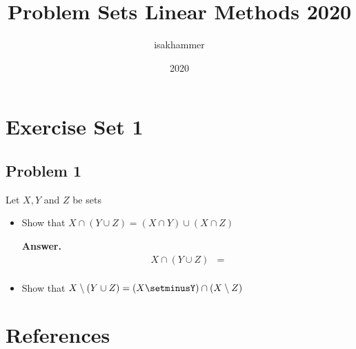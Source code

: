 \documentclass{article}
\title{Problem Sets Linear Methods 2020}
\author{isakhammer }
\date{2020}
\theoremstyle{remark}
\begin{document}
\maketitle
\tableofcontents
\newpage

\newpage
\section{Exercise Set 1}%
\label{sec:exercise_set_1}

\subsection{Problem 1}%
\label{sub:problem_1}

Let $X,Y$ and $Z$ be sets
\begin{itemize}
  \item Show that $X\cap \left( Y\cup Z \right) = \left( X\cap Y \right) \cup  \left( X\cap Z \right)$ 
    \begin{tcolorbox}
      \textbf{Answer.}  
      \[
        \begin{split}
          X \cap  \left( Y \cup  Z \right) &=   \\
        \end{split} 
      \] 
    \end{tcolorbox}

  \item Show that $X\setminus \left( Y\cup Z \right) = \left( X \setminusY \right) \cap  \left( X \setminus Z \right)$
\end{itemize}




\newpage
\section{References}%
\label{sec:references}



\end{document}
